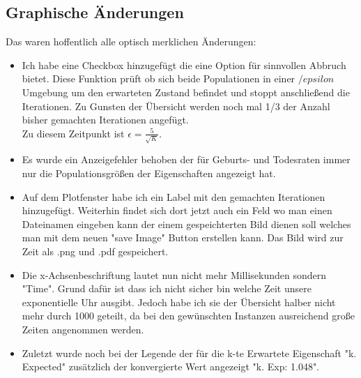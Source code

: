 \documentclass{article}
\begin{document}
\subsection{Graphische Änderungen}
Das waren hoffentlich alle optisch merklichen Änderungen:
\begin{itemize}
\item Ich habe eine Checkbox hinzugefügt die eine Option für sinnvollen Abbruch bietet. Diese Funktion prüft ob sich beide Populationen in einer $/epsilon$ Umgebung um den erwarteten Zustand befindet und stoppt anschließend die Iterationen. Zu Gunsten der Übersicht werden noch mal 1/3 der Anzahl bisher gemachten Iterationen angefügt.\\
Zu diesem Zeitpunkt ist $\epsilon = \frac{5}{\sqrt{K}}$.
\item Es wurde ein Anzeigefehler behoben der für Geburts- und Todesraten immer nur die Populationsgrößen der Eigenschaften angezeigt hat.
\item Auf dem Plotfenster habe ich ein Label mit den gemachten Iterationen hinzugefügt. Weiterhin findet sich dort jetzt auch ein Feld wo man einen Dateinamen eingeben kann der einem gespeichterten Bild dienen soll welches man mit dem neuen "{}save Image"{} Button erstellen kann. Das Bild wird zur Zeit als .png und .pdf gespeichert.
\item Die x-Achsenbeschriftung lautet nun nicht mehr Millisekunden sondern "{}Time"{}. Grund dafür ist dass ich nicht sicher bin welche Zeit unsere exponentielle Uhr ausgibt. Jedoch habe ich sie der Übersicht halber nicht mehr durch 1000 geteilt, da bei den gewünschten Instanzen ausreichend große Zeiten angenommen werden.
\item Zuletzt wurde noch bei der Legende der für die k-te Erwartete Eigenschaft "{}k. Expected"{} zusätzlich der konvergierte Wert angezeigt "{}k. Exp: 1.048"{}.
\end{itemize}
\end{document}
